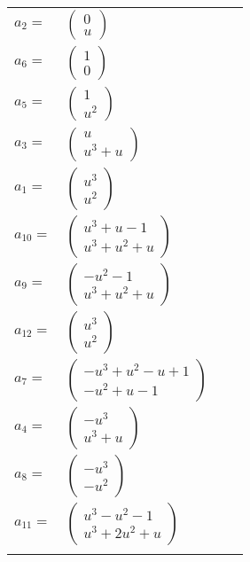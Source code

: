 \documentclass[1p]{elsarticle_modified}
\theoremstyle{definition}
\begin{document}
\begin{tabular}{m{7pt} m{180pt} m{7pt} m{180pt} }
\flushright $a_{2}=$&$\begin{pmatrix}0\\u\end{pmatrix}$ \\
\flushright $a_{6}=$&$\begin{pmatrix}1\\0\end{pmatrix}$ \\
\flushright $a_{5}=$&$\begin{pmatrix}1\\u^2\end{pmatrix}$ \\
\flushright $a_{3}=$&$\begin{pmatrix}u\\u^3+u\end{pmatrix}$ \\
\flushright $a_{1}=$&$\begin{pmatrix}u^3\\u^2\end{pmatrix}$ \\
\flushright $a_{10}=$&$\begin{pmatrix}u^3+u-1\\u^3+u^2+u\end{pmatrix}$ \\
\flushright $a_{9}=$&$\begin{pmatrix}- u^2-1\\u^3+u^2+u\end{pmatrix}$ \\
\flushright $a_{12}=$&$\begin{pmatrix}u^3\\u^2\end{pmatrix}$ \\
\flushright $a_{7}=$&$\begin{pmatrix}- u^3+u^2- u+1\\- u^2+u-1\end{pmatrix}$ \\
\flushright $a_{4}=$&$\begin{pmatrix}- u^3\\u^3+u\end{pmatrix}$ \\
\flushright $a_{8}=$&$\begin{pmatrix}- u^3\\- u^2\end{pmatrix}$ \\
\flushright $a_{11}=$&$\begin{pmatrix}u^3- u^2-1\\u^3+2 u^2+u\end{pmatrix}$\\&\end{tabular}
\end{document}
